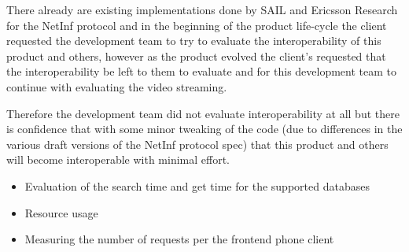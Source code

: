 There already are existing implementations done by SAIL and Ericsson Research for the NetInf protocol and in the beginning of the product life-cycle the client requested the development team to try to evaluate the interoperability of this product and others, however as the product evolved the client's requested that the interoperability be left to them to evaluate and for this development team to continue with evaluating the video streaming.

Therefore the development team did not evaluate interoperability at all but there is confidence that with some minor tweaking of the code (due to differences in the various draft versions of the NetInf protocol spec) that this product and others will become interoperable with minimal effort.


\begin{itemize}
\item Evaluation of the search time and get time for the supported databases
\item Resource usage
\item Measuring the number of requests per the frontend phone client
\end{itemize}
